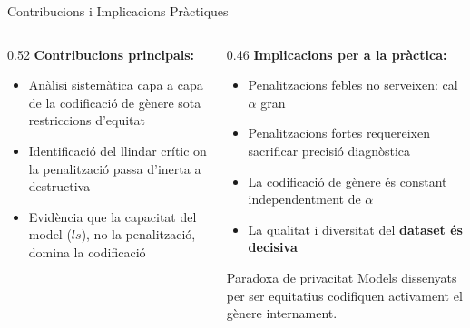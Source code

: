 \documentclass[aspectratio=169,12pt]{beamer}
\begin{document}
\begin{frame}{Contribucions i Implicacions Pràctiques}
  \begin{columns}[T]
    \begin{column}{0.52\textwidth}
      \textbf{Contribucions principals:}
      \begin{itemize}
        \setlength\itemsep{0.4em}
        \item Anàlisi sistemàtica capa a capa de la codificació de gènere sota restriccions d'equitat
        \item Identificació del llindar crític on la penalització passa d'inerta a destructiva
        \item Evidència que la capacitat del model ($ls$), no la penalització, domina la codificació
      \end{itemize}
    \end{column}
    \begin{column}{0.46\textwidth}
      \textbf{Implicacions per a la pràctica:}
      \begin{itemize}
        \setlength\itemsep{0.4em}
        \item Penalitzacions febles \alert{no serveixen}: cal $\alpha$ gran
        \item Penalitzacions fortes \alert{requereixen sacrificar} precisió diagnòstica
        \item La codificació de gènere és constant independentment de $\alpha$
        \item La qualitat i diversitat del \textbf{dataset és decisiva}
      \end{itemize}
      \vspace{0.3em}
      \begin{alertblock}{Paradoxa de privacitat}
        Models dissenyats per ser equitatius codifiquen activament el gènere internament.
      \end{alertblock}
    \end{column}
  \end{columns}
\end{frame}
\end{document}
